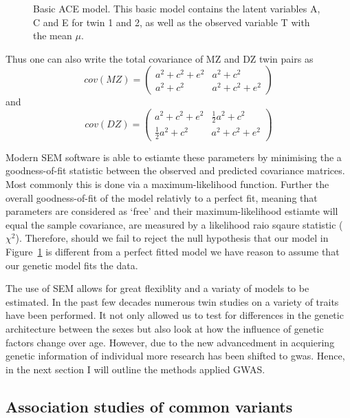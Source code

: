 \begin{figure}[htpb]
  \centering
  \scalebox{0.6}{}
  \caption{
    Basic ACE model.
    This basic model contains the latent variables A, C and E for twin 1 and 2, as well as the observed variable T with the mean $\mu$.
  }\label{fig:ace}
\end{figure}

Thus one can also write the total covariance of MZ and DZ twin pairs as
\begin{equation}
  cov(MZ) = 
  \begin{pmatrix}
    a^2 + c^2 + e^2 & a^2 + c^2 \\
    a^2 + c^2 & a^2 + c^2 + e^2
  \end{pmatrix}
\end{equation}
and 
\begin{equation}
  cov(DZ) = 
  \begin{pmatrix}
    a^2 + c^2 + e^2 & \frac{1}{2}a^2 + c^2 \\
    \frac{1}{2}a^2 + c^2 & a^2 + c^2 + e^2
  \end{pmatrix}
\end{equation}

Modern SEM software is able to estiamte these parameters by minimising the a goodness-of-fit statistic between the observed and predicted covariance matrices.
Most commonly this is done via a maximum-likelihood function.
Further the overall goodness-of-fit of the model relativly to a perfect fit, meaning that parameters are considered as `free' and their maximum-likelihood estiamte will equal the sample covariance, are measured by a likelihood raio sqaure statistic ($\chi^2$).
Therefore, should we fail to reject the null hypothesis that our model in Figure~\ref{fig:ace} is different from a perfect fitted model we have reason to assume that our genetic model fits the data.

The use of SEM allows for great flexiblity and a variaty of models to be estimated.
In the past few decades numerous twin studies on a variety of traits have been performed.
It not only allowed us to test for differences in the genetic architecture between the sexes but also look at how the influence of genetic factors change over age.
However, due to the new advancedment in acquiering genetic information of individual more research has been shifted to \acrfull{gwas}.
Hence, in the next section I will outline the methods applied GWAS\@.

\subsection{Association studies of common variants}
\label{sub:association_studies_of_common_variants}

